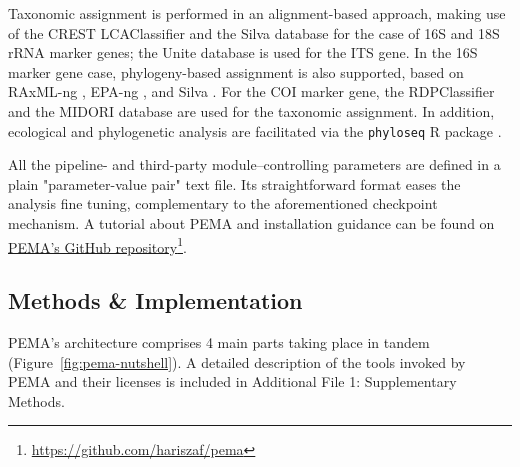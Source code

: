    Taxonomic assignment is performed in an alignment-based approach, making use of the CREST LCAClassifier \citep{lanzen2012crest} and the Silva database \citep{quast2012silva} for the case of 16S and 18S rRNA marker genes; 
   the Unite database \citep{rillig2019role} is used for the ITS gene. 
   In the 16S marker gene case, phylogeny-based assignment is also supported, based on RAxML-ng \citep{kozlov2019raxml}, 
   EPA-ng \citep{barbera2019epa}, and Silva \citep{quast2012silva}. 
   For the COI marker gene, the RDPClassifier \citep{wang2007naive} and the MIDORI database \citep{machida2017metazoan} are used for the taxonomic assignment. 
   In addition, ecological and phylogenetic analysis are facilitated via the \texttt{phyloseq} R package \citep{mcmurdie2013phyloseq}.
   
   All the pipeline- and third-party module–controlling parameters are defined in a plain "parameter-value pair" text file. Its straightforward format eases the analysis fine tuning, complementary to the aforementioned checkpoint mechanism. A tutorial about PEMA and installation guidance can be found on \href{https://github.com/hariszaf/pema}{PEMA's GitHub repository}\footnote{\href{https://github.com/hariszaf/pema}{https://github.com/hariszaf/pema}}.


   \subsection{Methods \& Implementation}

   PEMA's architecture comprises 4 main parts taking place in tandem (Figure~\ref{fig:pema-nutshell}). A detailed description of the tools invoked by PEMA and their licenses is included in Additional File 1: Supplementary Methods.


